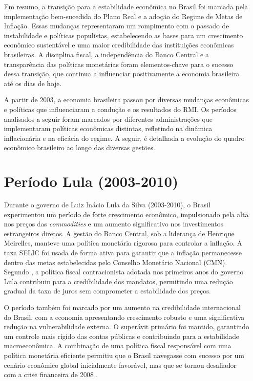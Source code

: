 \documentclass[12pt,oneside,a4paper,chapter=TITLE,english,brazil,sumario=abnt-6027-2012]{abntex2}
\begin{document}
Em resumo, a transição para a estabilidade econômica no Brasil foi marcada pela implementação bem-sucedida do Plano Real e a adoção do Regime de Metas de Inflação. Essas mudanças representaram um rompimento com o passado de instabilidade e políticas populistas, estabelecendo as bases para um crescimento econômico sustentável e uma maior credibilidade das instituições econômicas brasileiras. A disciplina fiscal, a independência do Banco Central e a transparência das políticas monetárias foram elementos-chave para o sucesso dessa transição, que continua a influenciar positivamente a economia brasileira até os dias de hoje.

A partir de 2003, a economia brasileira passou por diversas mudanças econômicas e políticas que influenciaram a condução e os resultados do RMI. Os períodos analisados a seguir foram marcados por diferentes administrações que implementaram políticas econômicas distintas, refletindo na dinâmica inflacionária e na eficácia do regime. A seguir, é detalhada a evolução do quadro econômico brasileiro ao longo das diversas gestões.

\section{Período Lula (2003-2010)}

Durante o governo de Luiz Inácio Lula da Silva (2003-2010), o Brasil experimentou um período de forte crescimento econômico, impulsionado pela alta nos preços das \textit{commodities} e um aumento significativo nos investimentos estrangeiros diretos. A gestão do Banco Central, sob a liderança de Henrique Meirelles, manteve uma política monetária rigorosa para controlar a inflação. A taxa SELIC foi usada de forma ativa para garantir que a inflação permanecesse dentro das metas estabelecidas pelo Conselho Monetário Nacional (CMN). Segundo , a política fiscal contracionista adotada nos primeiros anos do governo Lula contribuiu para a credibilidade dos mandatos, permitindo uma redução gradual da taxa de juros sem comprometer a estabilidade dos preços.

O período também foi marcado por um aumento na credibilidade internacional do Brasil, com a economia apresentando crescimento robusto e uma significativa redução na vulnerabilidade externa. O superávit primário foi mantido, garantindo um controle mais rígido das contas públicas e contribuindo para a estabilidade macroeconômica. A combinação de uma política fiscal responsável com uma política monetária eficiente permitiu que o Brasil navegasse com sucesso por um cenário econômico global inicialmente favorável, mas que se tornou desafiador com a crise financeira de 2008 \cite{fabiogiambiagi_2016_economia}.
\end{document}
